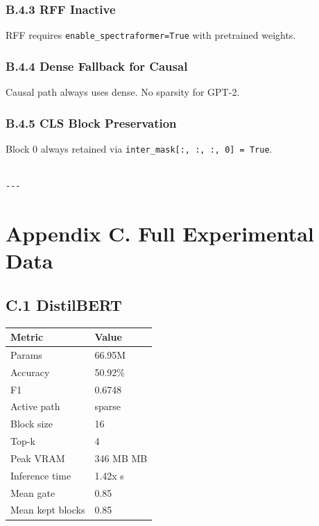 \subsubsection{B.4.3 RFF Inactive}

RFF requires \texttt{enable\_spectraformer=True} with pretrained weights.

\subsubsection{B.4.4 Dense Fallback for Causal}

Causal path always uses dense. No sparsity for GPT-2.

\subsubsection{B.4.5 CLS Block Preservation}

Block 0 always retained via \texttt{inter\_mask[:, :, :, 0] = True}.
\begin{lstlisting}

---
\end{lstlisting}

\section{Appendix C. Full Experimental Data}

\subsection{C.1 DistilBERT}

\begin{table}[H]
\centering
\small
\begin{tabular}{ll}
\toprule
\textbf{Metric} & \textbf{Value} \\
\midrule
Params & 66.95M \\
Accuracy & 50.92\% \\
F1 & 0.6748 \\
Active path & sparse \\
Block size & 16 \\
Top-k & 4 \\
Peak VRAM & 346 MB MB \\
Inference time & 1.42x s \\
Mean gate & 0.85 \\
Mean kept blocks & 0.85 \\
\bottomrule
\end{tabular}
\end{table}

